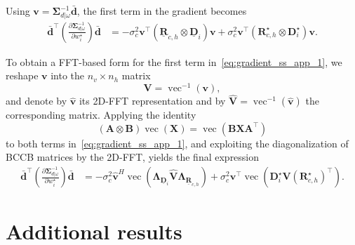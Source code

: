 \documentclass[12pt]{article}
\newcommand{\mycirc}[1] {\underline{\bm{#1}}}
\begin{document}
Using
$\bm{v}=\bm{\Sigma}_{d|\omega}^{-1}\bar{\bm{d}}$,
the first term in the gradient becomes
\begin{equation}\label{eq:gradient_ss_app_1}
\begin{split}
    \bar{\bm{d}}^{\top}
    \left(
        \frac{\partial \bm{\Sigma}_{d|\omega}^{-1}}
        {\partial w_i^\star}
    \right)
    \bar{\bm{d}}
    &=
    -\sigma_c^2
    \bm{v}^{\top}
    \left(
        \mycirc{R}_{c,h}
        \otimes
        \mycirc{D}_i
    \right)
    \bm{v}
    +
    \sigma_c^2
    \bm{v}^{\top}
    \left(
        \bm{R}_{c,h}^{\star}
        \otimes
        \bm{D}_i^{\star}
    \right)
    \bm{v}.
\end{split}
\end{equation}

To obtain a FFT-based form for the first term in~\eqref{eq:gradient_ss_app_1}, we reshape
$\bm{v}$ into the $n_v\times n_h$ matrix
\begin{equation}
    \bm{V}
    =
    \operatorname{vec}^{-1}(\bm{v}),
\end{equation}
and denote by
$\hat{\bm{v}}$
its 2D-FFT representation and by
$\hat{\bm{V}}
=
\operatorname{vec}^{-1}(\hat{\bm{v}})$
the corresponding matrix.
Applying the identity
\begin{equation}
    (\bm{A}\otimes\bm{B})\operatorname{vec}(\bm{X})
    =
    \operatorname{vec}
    \left(
        \bm{B}\bm{X}\bm{A}^{\top}
    \right)
\end{equation}
to both terms in~\eqref{eq:gradient_ss_app_1}, and exploiting the diagonalization of BCCB matrices by the 2D-FFT, yields the final expression
\begin{equation}
\begin{split}
    \bar{\bm{d}}^{\top}
    \left(
        \frac{\partial \bm{\Sigma}_{d|\omega}^{-1}}
        {\partial w_i^\star}
    \right)
    \bar{\bm{d}}
    &=
    -\sigma_c^2
    \hat{\bm{v}}^{H}
    \operatorname{vec}
    \left(
        \bm{\Lambda}_{\mycirc{D}_{i}}
        \hat{\bm{V}}
        \bm{\Lambda}_{\mycirc{R}_{c,h}}
    \right)
    +
    \sigma_c^2
    \bm{v}^{\top}
    \operatorname{vec}
    \left(
        \bm{D}_{i}^{\star}
        \bm{V}
        \left(
            \bm{R}_{c,h}^{\star}
        \right)^{\top}
    \right).
\end{split}
\end{equation}

\section{Additional results}
\end{document}
